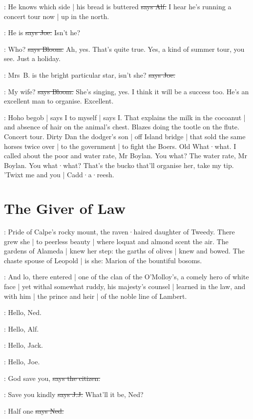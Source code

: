 \bergan:
He knows which side |
his bread is buttered
\sout{says Alf.}
I hear he's running a concert tour now |
up in the north.

\joe:
He is
\sout{says Joe.}
Isn't he?

\Bloom:
Who?
\sout{says Bloom.}
Ah,
yes.
That's quite true.
Yes,
a kind of summer tour,
you see.
Just a holiday.

\joe:
Mrs~B. is the bright particular star,
isn't she?
\sout{says Joe.}

\Bloom:
My wife?
\sout{says Bloom.}
She's singing,
yes.
I think it will be a success too.
He's an excellent man to organise.
Excellent.

\Nq:
Hoho begob |
says I to myself |
says I.
That explains the milk in the cocoanut |
and absence of hair on the animal's chest.
Blazes doing the tootle on the flute.
Concert tour.
Dirty Dan the dodger's son |
off Island bridge |
that sold the same horses twice over |
to the government |
to fight the Boers.
Old What·what.
I called about the poor and water rate,
Mr Boylan.
You what?
The water rate,
Mr Boylan.
You what·what?
That's the bucko that'll organise her,
take my tip.
'Twixt me and you |
Cadd·a·reesh.


\section{The Giver of Law}

:
Pride of Calpe's rocky mount,
the raven·haired daughter of Tweedy.
There grew she |
to peerless beauty |
where loquat and almond scent the air.
The gardens of Alameda |
knew her step:
the garths of olives |
knew and bowed.
The chaste spouse of Leopold |
is she:
Marion of the bountiful bosoms.

:
And lo,
there entered |
one of the clan of the O'Molloy's,
a comely hero of white face |
yet withal somewhat ruddy,
his majesty's counsel |
learned in the law,
and with him |
the prince and heir |
of the noble line of Lambert.

\bergan:
Hello,
Ned.

\lambert:
Hello,
Alf.

\joe:
Hello,
Jack.

\jjom:
Hello,
Joe.

\citizen:
God save you,
\sout{says the citizen.}

\jjom:
Save you kindly
\sout{says J.J.}
What'll it be,
Ned?

\lambert:
Half one
\sout{says Ned.}

